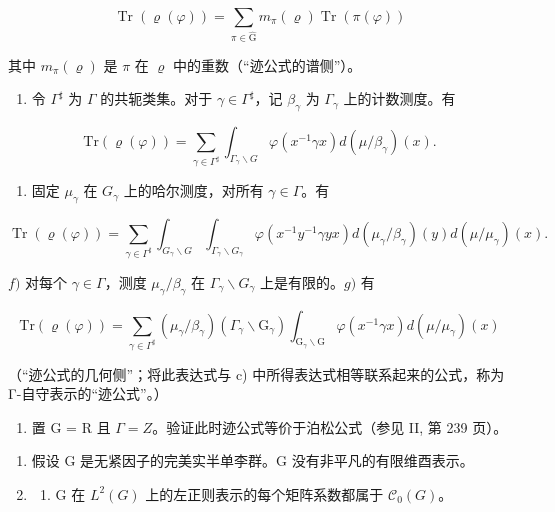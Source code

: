\[
\operatorname{Tr} (\varrho (\varphi)) = \sum_ {\pi \in \widehat {\mathrm{G}}} m _ {\pi} (\varrho) \operatorname{Tr} (\pi (\varphi))
\]

其中 \(m_{\pi}(\varrho)\) 是 \(\pi\) 在 \(\varrho\) 中的重数（“迹公式的谱侧”）。

\begin{enumerate}
\def\labelenumi{\alph{enumi})}
\setcounter{enumi}{3}
\tightlist
\item
  令 \(\Gamma^{\sharp}\) 为 \(\Gamma\) 的共轭类集。对于 \(\gamma \in \Gamma^{\sharp}\)，记 \(\beta_{\gamma}\) 为 \(\Gamma_{\gamma}\) 上的计数测度。有
\end{enumerate}

\[
\mathrm{Tr} (\varrho (\varphi)) = \sum_ {\gamma \in \Gamma^ {\sharp}} \int_ {\Gamma_ {\gamma} \backslash G} \varphi (x ^ {- 1} \gamma x) d (\mu / \beta_ {\gamma}) (x).
\]

\begin{enumerate}
\def\labelenumi{\alph{enumi})}
\setcounter{enumi}{4}
\tightlist
\item
  固定 \(\mu_{\gamma}\) 在 \(G_{\gamma}\) 上的哈尔测度，对所有 \(\gamma \in \Gamma\)。有
\end{enumerate}

\[
\operatorname{Tr} (\varrho (\varphi)) = \sum_ {\gamma \in \Gamma^ {\sharp}} \int_ {G _ {\gamma} \backslash G} \int_ {\Gamma_ {\gamma} \backslash G _ {\gamma}} \varphi (x ^ {- 1} y ^ {- 1} \gamma y x) d (\mu_ {\gamma} / \beta_ {\gamma}) (y) d (\mu / \mu_ {\gamma}) (x).
\]

\(f)\) 对每个 \(\gamma \in \Gamma\)，测度 \(\mu_{\gamma} / \beta_{\gamma}\) 在 \(\Gamma_{\gamma} \backslash G_{\gamma}\) 上是有限的。\(g)\) 有

\[
\mathrm{Tr} (\varrho (\varphi)) = \sum_ {\gamma \in \Gamma^ {\sharp}} (\mu_ {\gamma} / \beta_ {\gamma}) (\Gamma_ {\gamma} \backslash \mathrm{G} _ {\gamma}) \int_ {\mathrm{G} _ {\gamma} \backslash \mathrm{G}} \varphi (x ^ {- 1} \gamma x) d (\mu / \mu_ {\gamma}) (x)
\]

（“迹公式的几何侧”；将此表达式与 c) 中所得表达式相等联系起来的公式，称为 Γ-自守表示的“迹公式”。）

\begin{enumerate}
\def\labelenumi{\alph{enumi})}
\setcounter{enumi}{7}
\tightlist
\item
  置 G = R 且 \(\Gamma = Z\)。验证此时迹公式等价于泊松公式（参见 II, 第 239 页）。
\end{enumerate}

\begin{enumerate}
\def\labelenumi{\arabic{enumi})}
\setcounter{enumi}{8}
\item
  假设 G 是无紧因子的完美实半单李群。G 没有非平凡的有限维酉表示。
\item
  \begin{enumerate}
  \def\labelenumii{\alph{enumii})}
  \tightlist
  \item
    G 在 \(L^{2}(G)\) 上的左正则表示的每个矩阵系数都属于 \(\mathcal{C}_{0}(G)\)。
  \end{enumerate}
\end{enumerate}

